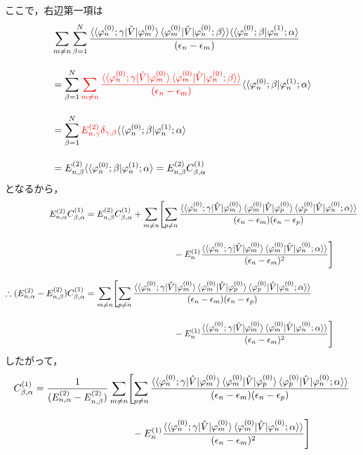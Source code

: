 ここで，右辺第一項は
\begin{align}
    &\sum_{m\neq n}
    \sum_{\beta=1}^N
    \frac{\langle\braket{\varphi^{(0)}_{n};\gamma|\hat{V}|\varphi^{(0)}_m}
    \langle{\varphi^{(0)}_{m}|\hat{V}|\varphi^{(0)}_n;\beta}\rangle\rangle
    \langle\langle{\varphi^{(0)}_n;\beta|\varphi^{(1)}_n;\alpha}\rangle}{(\epsilon_n-\epsilon_m)}\nn[10pt]
    &=
    \sum_{\beta=1}^N
    \textcolor{red}{
    \sum_{m\neq n}
    \frac{\langle\braket{\varphi^{(0)}_{n};\gamma|\hat{V}|\varphi^{(0)}_m}
    \langle{\varphi^{(0)}_{m}|\hat{V}|\varphi^{(0)}_n;\beta}\rangle\rangle
    }{(\epsilon_n-\epsilon_m)}}\langle\langle{\varphi^{(0)}_n;\beta|\varphi^{(1)}_n;\alpha}\rangle\nn[10pt]
    &=
    \sum_{\beta=1}^N
    \textcolor{red}{
    E^{(2)}_{n,\gamma}\delta_{\gamma,\beta}
    }
    \langle\langle{\varphi^{(0)}_n;\beta|\varphi^{(1)}_n;\alpha}\rangle\nn[10pt]
    &=E^{(2)}_{n,\beta}
    \langle\langle{\varphi^{(0)}_n;\beta|\varphi^{(1)}_n;\alpha}\rangle
    =E^{(2)}_{n,\beta}
    C^{(1)}_{\beta,\alpha}
\end{align}
となるから，
\begin{align}
    E^{(2)}_{n,\alpha}C^{(1)}_{\beta,\alpha}
    &=
    E^{(2)}_{n,\beta}
    C^{(1)}_{\beta,\alpha}
    +\sum_{m\neq n}\Biggl[\sum_{p\neq n}
    \frac{\langle\braket{\varphi^{(0)}_{n};\gamma|\hat{V}|\varphi^{(0)}_m}
    \langle{\varphi^{(0)}_{m}|\hat{V}|\varphi^{(0)}_p}\rangle
    \braket{\varphi^{(0)}_{p}|\hat{V}|\varphi^{(0)}_n;\alpha}\rangle}
    {(\epsilon_n-\epsilon_m)(\epsilon_n-\epsilon_p)}\nn[10pt]
    &\hspace{100pt}
    -E^{(1)}_n
    \frac{\langle\braket{\varphi^{(0)}_{n};\gamma|\hat{V}|\varphi^{(0)}_m}
    \braket{\varphi^{(0)}_{m}|\hat{V}|\varphi^{(0)}_n;\alpha}\rangle}{(\epsilon_n-\epsilon_m)^2}
    \Biggr]
    \nn[10pt]
    \therefore
    (E^{(2)}_{n,\alpha}-E^{(2)}_{n,\beta})C^{(1)}_{\beta,\alpha}&=
    \sum_{m\neq n}\Biggl[\sum_{p\neq n}
    \frac{\langle\braket{\varphi^{(0)}_{n};\gamma|\hat{V}|\varphi^{(0)}_m}
    \langle{\varphi^{(0)}_{m}|\hat{V}|\varphi^{(0)}_p}\rangle
    \braket{\varphi^{(0)}_{p}|\hat{V}|\varphi^{(0)}_n;\alpha}\rangle}
    {(\epsilon_n-\epsilon_m)(\epsilon_n-\epsilon_p)}\nn[10pt]
    &\hspace{100pt}
    -E^{(1)}_n
    \frac{\langle\braket{\varphi^{(0)}_{n};\gamma|\hat{V}|\varphi^{(0)}_m}
    \braket{\varphi^{(0)}_{m}|\hat{V}|\varphi^{(0)}_n;\alpha}\rangle}{(\epsilon_n-\epsilon_m)^2}
    \Biggr]
\end{align}
したがって，
\begin{align}
    C^{(1)}_{\beta,\alpha}
    &=
    \frac{1}{(E^{(2)}_{n,\alpha}-E^{(2)}_{n,\beta})}
    \sum_{m\neq n}\Biggl[\sum_{p\neq n}
    \frac{\langle\braket{\varphi^{(0)}_{n};\gamma|\hat{V}|\varphi^{(0)}_m}
    \langle{\varphi^{(0)}_{m}|\hat{V}|\varphi^{(0)}_p}\rangle
    \braket{\varphi^{(0)}_{p}|\hat{V}|\varphi^{(0)}_n;\alpha}\rangle}
    {(\epsilon_n-\epsilon_m)(\epsilon_n-\epsilon_p)}\nn[10pt]
    &\hspace{100pt}
    -E^{(1)}_n
    \frac{\langle\braket{\varphi^{(0)}_{n};\gamma|\hat{V}|\varphi^{(0)}_m}
    \braket{\varphi^{(0)}_{m}|\hat{V}|\varphi^{(0)}_n;\alpha}\rangle}{(\epsilon_n-\epsilon_m)^2}
    \Biggr]
\end{align}
